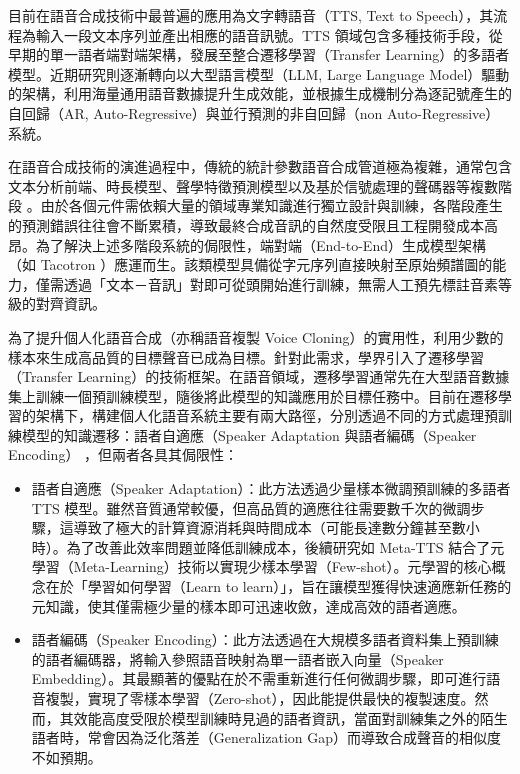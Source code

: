 目前在語音合成技術中最普遍的應用為文字轉語音（TTS, Text to Speech），其流程為輸入一段文本序列並產出相應的語音訊號。TTS 領域包含多種技術手段，從早期的單一語者端對端架構，發展至整合遷移學習（Transfer Learning）的多語者模型。近期研究則逐漸轉向以大型語言模型（LLM, Large Language Model）驅動的架構，利用海量通用語音數據提升生成效能，並根據生成機制分為逐記號產生的自回歸（AR, Auto-Regressive）與並行預測的非自回歸（non Auto-Regressive）系統。

在語音合成技術的演進過程中，傳統的統計參數語音合成管道極為複雜，通常包含文本分析前端、時長模型、聲學特徵預測模型以及基於信號處理的聲碼器等複數階段 \cite{zen2016fast}。由於各個元件需依賴大量的領域專業知識進行獨立設計與訓練，各階段產生的預測錯誤往往會不斷累積，導致最終合成音訊的自然度受限且工程開發成本高昂。為了解決上述多階段系統的侷限性，端對端（End-to-End）生成模型架構（如 Tacotron \cite{wang2017tacotron}）應運而生。該類模型具備從字元序列直接映射至原始頻譜圖的能力，僅需透過「文本－音訊」對即可從頭開始進行訓練，無需人工預先標註音素等級的對齊資訊。

為了提升個人化語音合成（亦稱語音複製 Voice Cloning）的實用性，利用少數的樣本來生成高品質的目標聲音已成為目標。針對此需求，學界引入了遷移學習（Transfer Learning）的技術框架。在語音領域，遷移學習通常先在大型語音數據集上訓練一個預訓練模型，隨後將此模型的知識應用於目標任務中。目前在遷移學習的架構下，構建個人化語音系統主要有兩大路徑，分別透過不同的方式處理預訓練模型的知識遷移：語者自適應（Speaker Adaptation{\color{red} \cite{chen2021adaspeech, huang2022metatts}} 與語者編碼（Speaker Encoding）{\color{red} \cite{casanova2024xtts, chen2024f5tts, leng2024fishspeech, zhou2025indextts2}}，但兩者各具其侷限性：

\begin{itemize}
    \item 語者自適應（Speaker Adaptation）：此方法透過少量樣本微調預訓練的多語者 TTS 模型。雖然音質通常較優，但高品質的適應往往需要數千次的微調步驟，這導致了極大的計算資源消耗與時間成本（可能長達數分鐘甚至數小時）。為了改善此效率問題並降低訓練成本，後續研究如 Meta-TTS \cite{huang2022metatts} 結合了元學習（Meta-Learning）技術以實現少樣本學習（Few-shot）。元學習的核心概念在於「學習如何學習（Learn to learn）」，旨在讓模型獲得快速適應新任務的元知識，使其僅需極少量的樣本即可迅速收斂，達成高效的語者適應。
    \item 語者編碼（Speaker Encoding）：此方法透過在大規模多語者資料集上預訓練的語者編碼器，將輸入參照語音映射為單一語者嵌入向量（Speaker Embedding）。其最顯著的優點在於不需重新進行任何微調步驟，即可進行語音複製，實現了零樣本學習（Zero-shot），因此能提供最快的複製速度。然而，其效能高度受限於模型訓練時見過的語者資訊，當面對訓練集之外的陌生語者時，常會因為泛化落差（Generalization Gap）而導致合成聲音的相似度不如預期。
\end{itemize}

